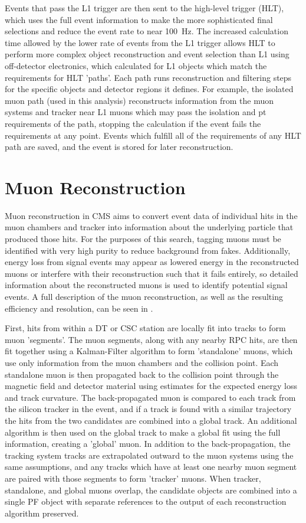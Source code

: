Events that pass the L1 trigger are then sent to the high-level trigger (HLT), which uses the full event information to make the more sophisticated final selections and reduce the event rate to near \SI{100}{\hertz}.
The increased calculation time allowed by the lower rate of events from the L1 trigger allows HLT to perform more complex object reconstruction and event selection than L1 using off-detector electronics, which calculated for L1 objects which match the requirements for HLT 'paths'.
Each path runs reconstruction and filtering steps for the specific objects and detector regions it defines.
For example, the isolated muon path (used in this analysis) reconstructs information from the muon systems and tracker near L1 muons which may pass the isolation and pt requirements of the path, stopping the calculation if the event fails the requirements at any point.
Events which fulfill all of the requirements of any HLT path are saved, and the event is stored for later reconstruction.

\section{Muon Reconstruction}
Muon reconstruction in CMS aims to convert event data of individual hits in the muon chambers and tracker into information about the underlying particle that produced those hits.
For the purposes of this search, tagging muons must be identified with very high purity to reduce background from fakes. 
Additionally, energy loss from signal events may appear as lowered energy in the reconstructed muons or interfere with their reconstruction such that it fails entirely, so detailed information about the reconstructed muons is used to identify potential signal events.
A full description of the muon reconstruction, as well as the resulting efficiency and resolution, can be seen in \cite{Sirunyan2018}.

First, hits from within a DT or CSC station are locally fit into tracks to form muon 'segments'.
The muon segments, along with any nearby RPC hits, are then fit together using a Kalman-Filter algorithm to form 'standalone' muons, which use only information from the muon chambers and the collision point.
Each standalone muon is then propagated back to the collision point through the magnetic field and detector material using estimates for the expected energy loss and track curvature.
The back-propagated muon is compared to each track from the silicon tracker in the event, and if a track is found with a similar trajectory the hits from the two candidates are combined into a global track.
An additional \kf algorithm is then used on the global track to make a global fit using the full information, creating a 'global' muon. 
In addition to the back-propagation, the tracking system tracks are extrapolated outward to the muon systems using the same assumptions, and any tracks which have at least one nearby muon segment are paired with those segments to form 'tracker' muons. 
When tracker, standalone, and global muons overlap, the candidate objects are combined into a single PF object with separate references to the output of each reconstruction algorithm preserved.

